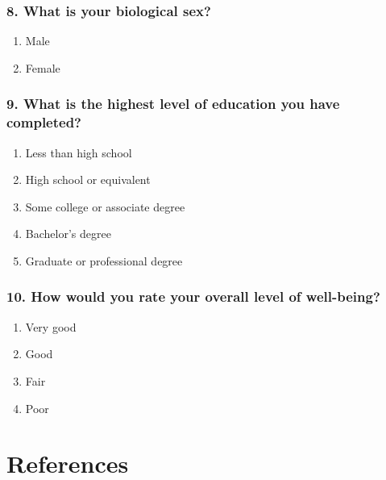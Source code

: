 \documentclass[
  letterpaper,
  DIV=11,
  numbers=noendperiod]{scrartcl}
\providecommand{\tightlist}{%
  \setlength{\itemsep}{0pt}\setlength{\parskip}{0pt}}\usepackage{longtable,booktabs,array}
\begin{document}
\hypertarget{what-is-your-biological-sex}{%
\subsubsection{8. What is your biological
sex?}\label{what-is-your-biological-sex}}

\begin{enumerate}
\def\labelenumi{\alph{enumi}.}
\tightlist
\item
  Male
\item
  Female
\end{enumerate}

\hypertarget{what-is-the-highest-level-of-education-you-have-completed}{%
\subsubsection{9. What is the highest level of education you have
completed?}\label{what-is-the-highest-level-of-education-you-have-completed}}

\begin{enumerate}
\def\labelenumi{\alph{enumi}.}
\tightlist
\item
  Less than high school
\item
  High school or equivalent
\item
  Some college or associate degree
\item
  Bachelor's degree
\item
  Graduate or professional degree
\end{enumerate}

\hypertarget{how-would-you-rate-your-overall-level-of-well-being}{%
\subsubsection{10. How would you rate your overall level of
well-being?}\label{how-would-you-rate-your-overall-level-of-well-being}}

\begin{enumerate}
\def\labelenumi{\alph{enumi}.}
\tightlist
\item
  Very good
\item
  Good
\item
  Fair
\item
  Poor
\end{enumerate}

\newpage

\hypertarget{references}{%
\section*{References}\label{references}}
\end{document}

